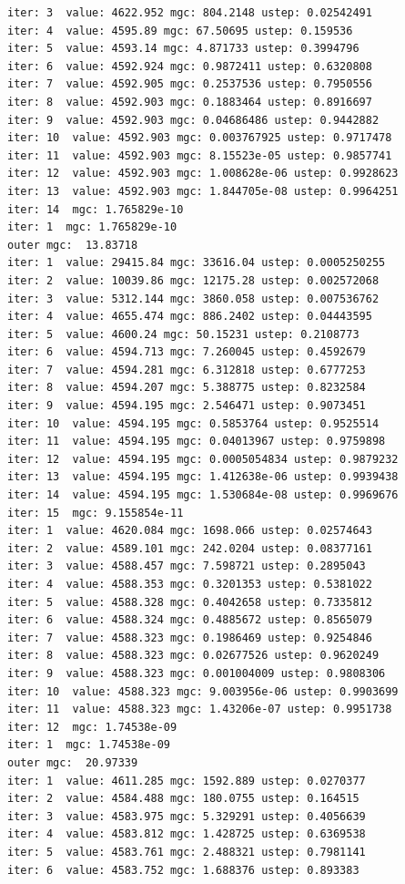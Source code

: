 \documentclass[
  letterpaper,
  DIV=11,
  numbers=noendperiod]{scrartcl}
\begin{document}
\begin{verbatim}
iter: 3  value: 4622.952 mgc: 804.2148 ustep: 0.02542491 
iter: 4  value: 4595.89 mgc: 67.50695 ustep: 0.159536 
iter: 5  value: 4593.14 mgc: 4.871733 ustep: 0.3994796 
iter: 6  value: 4592.924 mgc: 0.9872411 ustep: 0.6320808 
iter: 7  value: 4592.905 mgc: 0.2537536 ustep: 0.7950556 
iter: 8  value: 4592.903 mgc: 0.1883464 ustep: 0.8916697 
iter: 9  value: 4592.903 mgc: 0.04686486 ustep: 0.9442882 
iter: 10  value: 4592.903 mgc: 0.003767925 ustep: 0.9717478 
iter: 11  value: 4592.903 mgc: 8.15523e-05 ustep: 0.9857741 
iter: 12  value: 4592.903 mgc: 1.008628e-06 ustep: 0.9928623 
iter: 13  value: 4592.903 mgc: 1.844705e-08 ustep: 0.9964251 
iter: 14  mgc: 1.765829e-10 
iter: 1  mgc: 1.765829e-10 
outer mgc:  13.83718 
iter: 1  value: 29415.84 mgc: 33616.04 ustep: 0.0005250255 
iter: 2  value: 10039.86 mgc: 12175.28 ustep: 0.002572068 
iter: 3  value: 5312.144 mgc: 3860.058 ustep: 0.007536762 
iter: 4  value: 4655.474 mgc: 886.2402 ustep: 0.04443595 
iter: 5  value: 4600.24 mgc: 50.15231 ustep: 0.2108773 
iter: 6  value: 4594.713 mgc: 7.260045 ustep: 0.4592679 
iter: 7  value: 4594.281 mgc: 6.312818 ustep: 0.6777253 
iter: 8  value: 4594.207 mgc: 5.388775 ustep: 0.8232584 
iter: 9  value: 4594.195 mgc: 2.546471 ustep: 0.9073451 
iter: 10  value: 4594.195 mgc: 0.5853764 ustep: 0.9525514 
iter: 11  value: 4594.195 mgc: 0.04013967 ustep: 0.9759898 
iter: 12  value: 4594.195 mgc: 0.0005054834 ustep: 0.9879232 
iter: 13  value: 4594.195 mgc: 1.412638e-06 ustep: 0.9939438 
iter: 14  value: 4594.195 mgc: 1.530684e-08 ustep: 0.9969676 
iter: 15  mgc: 9.155854e-11 
iter: 1  value: 4620.084 mgc: 1698.066 ustep: 0.02574643 
iter: 2  value: 4589.101 mgc: 242.0204 ustep: 0.08377161 
iter: 3  value: 4588.457 mgc: 7.598721 ustep: 0.2895043 
iter: 4  value: 4588.353 mgc: 0.3201353 ustep: 0.5381022 
iter: 5  value: 4588.328 mgc: 0.4042658 ustep: 0.7335812 
iter: 6  value: 4588.324 mgc: 0.4885672 ustep: 0.8565079 
iter: 7  value: 4588.323 mgc: 0.1986469 ustep: 0.9254846 
iter: 8  value: 4588.323 mgc: 0.02677526 ustep: 0.9620249 
iter: 9  value: 4588.323 mgc: 0.001004009 ustep: 0.9808306 
iter: 10  value: 4588.323 mgc: 9.003956e-06 ustep: 0.9903699 
iter: 11  value: 4588.323 mgc: 1.43206e-07 ustep: 0.9951738 
iter: 12  mgc: 1.74538e-09 
iter: 1  mgc: 1.74538e-09 
outer mgc:  20.97339 
iter: 1  value: 4611.285 mgc: 1592.889 ustep: 0.0270377 
iter: 2  value: 4584.488 mgc: 180.0755 ustep: 0.164515 
iter: 3  value: 4583.975 mgc: 5.329291 ustep: 0.4056639 
iter: 4  value: 4583.812 mgc: 1.428725 ustep: 0.6369538 
iter: 5  value: 4583.761 mgc: 2.488321 ustep: 0.7981141 
iter: 6  value: 4583.752 mgc: 1.688376 ustep: 0.893383 

\end{verbatim}
\end{document}
